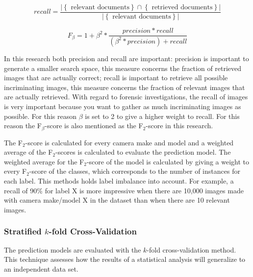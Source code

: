 \begin{equation}\label{eq:1}
recall = \frac{ \left\vert{\left\{ \text{ relevant documents} \right\} \cap \left\{ \text{ retrieved documents} \right\}}\right\vert }{ \left\vert{\left\{ \text{ relevant documents} \right\}}\right\vert}
\end{equation}


\begin{equation}\label{eq:1}
F_\beta = 1 + \beta^{2} * \frac{precision * recall}{(\beta^{2} *precision) + recall}
\end{equation}

In this research both precision and recall are important: precision is important to generate a smaller search space, this measure concerns the fraction of retrieved images that are actually correct; recall is important to retrieve all possible incriminating images, this measure concerns the fraction of relevant images that are actually retrieved. With regard to forensic investigations, the recall of images is very important because you want to gather as much incriminating images as possible. For this reason $\beta$ is set to 2 to give a higher weight to recall. For this reason the F$_\beta$-score is also mentioned as the F$_2$-score in this research.

The F$_2$-score is calculated for every camera make and model and a weighted average of the F$_2$-scores is calculated to evaluate the prediction model. The weighted average for the F$_2$-score of the model is calculated by giving a weight to every F$_2$-score of the classes, which corresponds to the number of instances for each label. This methods holds label imbalance into account. For example, a recall of 90\% for label X is more impressive when there are 10,000 images made with camera make/model X in the dataset than when there are 10 relevant images.


\subsubsection{Stratified $k$-fold Cross-Validation}
The prediction models are evaluated with the $k$-fold cross-validation method. This technique assesses how the results of a statistical analysis will generalize to an independent data set.

